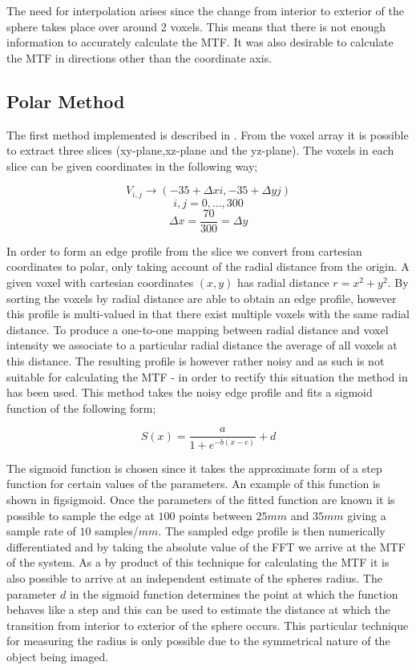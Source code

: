 \documentclass[
  twoside,
  11pt, a4paper,
  footinclude=true,
  headinclude=true,
  cleardoublepage=empty
]{scrbook}
\begin{document}
The need for interpolation arises since the change from interior to exterior of the sphere takes place over around 2 voxels. This means that there is not enough information to accurately calculate the MTF. It was also desirable to calculate the MTF in directions other than the coordinate axis.

\subsection{Polar Method}
The first method implemented is described in \cite{Friedman2013}. From the voxel array it is possible to extract three slices (xy-plane,xz-plane and the yz-plane). The voxels in each slice can be given coordinates in the following way;

\[
V_{i,j} \rightarrow (-35+\Delta x i,-35+\Delta y j)
\]
\[
i,j = 0,\dots,300
\]
\[
\Delta x = \frac{70}{300} = \Delta y
\]

In order to form an edge profile from the slice we convert from cartesian coordinates to polar, only taking account of the radial distance from the origin. A given voxel with cartesian coordinates $(x,y)$ has radial distance $r = x^2 + y^2$. By sorting the voxels by radial distance are able to obtain an edge profile, however this profile is multi-valued in that there exist multiple voxels with the same radial distance. To produce a one-to-one mapping between radial distance and voxel intensity we associate to a particular radial distance the average of all voxels at this distance. The resulting profile is however rather noisy and as such is not suitable for calculating the MTF - in order to rectify this situation the method in \cite{Takenaga2014} has been used. This method takes the noisy edge profile and fits a sigmoid function of the following form;

\[
S(x) = \frac{a}{1+e^{-b(x-c)}} + d
\]

The sigmoid function is chosen since it takes the approximate form of a step function for certain values of the parameters. An example of this function is shown in fig{sigmoid}. Once the parameters of the fitted function are known it is possible to sample the edge at $100$ points between $25mm$ and $35mm$ giving a sample rate of $10$ samples/$mm$. The sampled edge profile is then numerically differentiated and by taking the absolute value of the FFT we arrive at the MTF of the system. As a by product of this technique for calculating the MTF it is also possible to arrive at an independent estimate of the spheres radius. The parameter $d$ in the sigmoid function determines the point at which the function behaves like a step and this can be used to estimate the distance at which the transition from interior to exterior of the sphere occurs. This particular technique for measuring the radius is only possible due to the symmetrical nature of the object being imaged.
\end{document}
